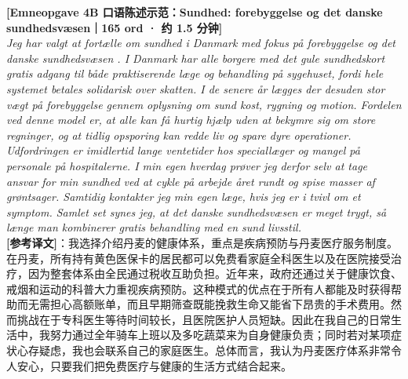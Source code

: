 \begin{transbox}
\small
\textbf{\color{NCDNavy}[Emneopgave 4B 口语陈述示范：Sundhed: forebyggelse og det danske sundhedsvæsen｜165 ord · 约 1.5 分钟]}\\
\textit{Jeg har valgt at fortælle om sundhed i Danmark med fokus på forebyggelse og det danske sundhedsvæsen . I Danmark har alle borgere med det gule sundhedskort gratis adgang til både praktiserende læge og behandling på sygehuset, fordi hele systemet betales solidarisk over skatten. I de senere år lægges der desuden stor vægt på forebyggelse  gennem oplysning om sund kost, rygning og motion. Fordelen ved denne model er, at alle kan få hurtig hjælp uden at bekymre sig om store regninger, og at tidlig opsporing kan redde liv og spare dyre operationer. Udfordringen er imidlertid lange ventetider hos speciallæger og mangel på personale på hospitalerne. I min egen hverdag prøver jeg derfor selv at tage ansvar for min sundhed ved at cykle på arbejde året rundt og spise masser af grøntsager. Samtidig kontakter jeg min egen læge, hvis jeg er i tvivl om et symptom. Samlet set synes jeg, at det danske sundhedsvæsen er meget trygt, så længe man kombinerer gratis behandling med en sund livsstil.}\\[4pt]
\textbf{\color{NCDTeal}[参考译文]}：我选择介绍丹麦的健康体系，重点是疾病预防与丹麦医疗服务制度。在丹麦，所有持有黄色医保卡的居民都可以免费看家庭全科医生以及在医院接受治疗，因为整套体系由全民通过税收互助负担。近年来，政府还通过关于健康饮食、戒烟和运动的科普大力重视疾病预防。这种模式的优点在于所有人都能及时获得帮助而无需担心高额账单，而且早期筛查既能挽救生命又能省下昂贵的手术费用。然而挑战在于专科医生等待时间较长，且医院医护人员短缺。因此在我自己的日常生活中，我努力通过全年骑车上班以及多吃蔬菜来为自身健康负责；同时若对某项症状心存疑虑，我也会联系自己的家庭医生。总体而言，我认为丹麦医疗体系非常令人安心，只要我们把免费医疗与健康的生活方式结合起来。
\end{transbox}

